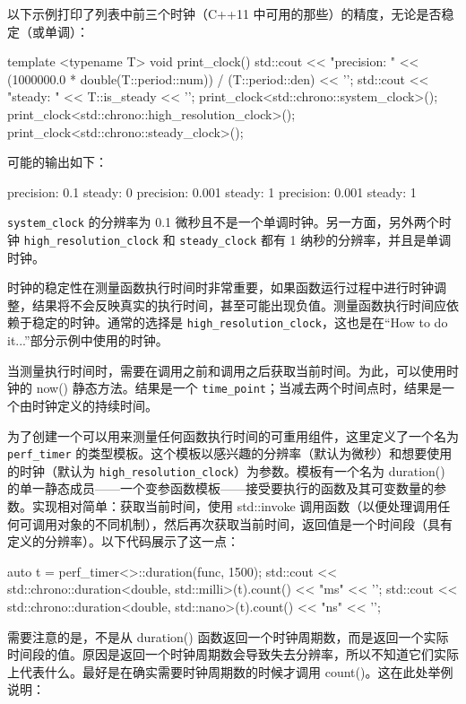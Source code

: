 以下示例打印了列表中前三个时钟（C++11 中可用的那些）的精度，无论是否稳定（或单调）：

\begin{cpp}
template <typename T>
void print_clock()
{
    std::cout << "precision: "
              << (1000000.0 * double(T::period::num)) /
                 (T::period::den)
              << '\n';
    std::cout << "steady: " << T::is_steady << '\n';
}
print_clock<std::chrono::system_clock>();
print_clock<std::chrono::high_resolution_clock>();
print_clock<std::chrono::steady_clock>();
\end{cpp}

可能的输出如下：

\begin{shell}
precision: 0.1
steady: 0
precision: 0.001
steady: 1
precision: 0.001
steady: 1
\end{shell}

\verb|system_clock| 的分辨率为 0.1 微秒且不是一个单调时钟。另一方面，另外两个时钟 \verb|high_resolution_clock| 和 \verb|steady_clock| 都有 1 纳秒的分辨率，并且是单调时钟。

时钟的稳定性在测量函数执行时间时非常重要，如果函数运行过程中进行时钟调整，结果将不会反映真实的执行时间，甚至可能出现负值。测量函数执行时间应依赖于稳定的时钟。通常的选择是 \verb|high_resolution_clock|，这也是在“How to do it...”部分示例中使用的时钟。

当测量执行时间时，需要在调用之前和调用之后获取当前时间。为此，可以使用时钟的 now() 静态方法。结果是一个 \verb|time_point|；当减去两个时间点时，结果是一个由时钟定义的持续时间。

为了创建一个可以用来测量任何函数执行时间的可重用组件，这里定义了一个名为 \verb|perf_timer| 的类型模板。这个模板以感兴趣的分辨率（默认为微秒）和想要使用的时钟（默认为 \verb|high_resolution_clock|）为参数。模板有一个名为 duration() 的单一静态成员——一个变参函数模板——接受要执行的函数及其可变数量的参数。实现相对简单：获取当前时间，使用 std::invoke 调用函数（以便处理调用任何可调用对象的不同机制），然后再次获取当前时间，返回值是一个时间段（具有定义的分辨率）。以下代码展示了这一点：

\begin{cpp}
auto t = perf_timer<>::duration(func, 1500);
std::cout << std::chrono::duration<double, std::milli>(t).count()
          << "ms" << '\n';
std::cout << std::chrono::duration<double, std::nano>(t).count()
          << "ns" << '\n';
\end{cpp}

需要注意的是，不是从 duration() 函数返回一个时钟周期数，而是返回一个实际时间段的值。原因是返回一个时钟周期数会导致失去分辨率，所以不知道它们实际上代表什么。最好是在确实需要时钟周期数的时候才调用 count()。这在此处举例说明：

